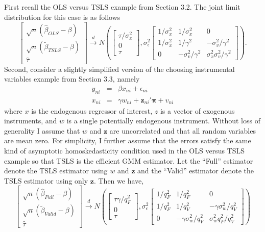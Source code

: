 \documentclass[12pt,letterpaper]{article}
\begin{document}
First recall the OLS versus TSLS example from Section 3.2.
The joint limit distribution for this case is as follows
\begin{equation*}
  \left[ 
  \begin{array}{c}
    \sqrt{n} \left( \widehat{\beta}_{OLS} - \beta \right)\\
    \sqrt{n} \left( \widetilde{\beta}_{TSLS} - \beta \right)\\
    \widehat{\tau}
\end{array}
\right] \overset{d}{\rightarrow} N\left( \left[
\begin{array}{c}
  \tau/\sigma_x^2 \\ 0 \\ \tau
\end{array}
\right], \sigma_{\epsilon}^2 
\left[
\begin{array}{ccc}
  1/\sigma_x^2 & 1/\sigma_x^2 & 0\\
  1/\sigma_x^2 & 1/\gamma^2 & -\sigma_v^2/\gamma^2\\
  0 & -\sigma_v^2/\gamma^2 & \sigma_x^2 \sigma_v^2/\gamma^2
\end{array}
\right]\right).
\end{equation*}
Second, consider a slightly simplified version of the choosing instrumental variables example from Section 3.3, namely
\begin{eqnarray*}
  y_{ni} &=& \beta x_{ni} + \epsilon_{ni}\\
  x_{ni} &=& \gamma w_{ni} + \mathbf{z}_{ni}' \boldsymbol{\pi} + v_{ni}
\end{eqnarray*}
where $x$ is the endogenous regressor of interest, $z$ is a vector of exogenous instruments, and $w$ is a single potentially endogenous instrument.
Without loss of generality I assume that $w$ and $\mathbf{z}$ are uncorrelated and that all random variables are mean zero.
For simplicity, I further assume that the errors satisfy the same kind of asymptotic homoskedasticity condition used in the OLS versus TSLS example so that TSLS is the efficient GMM estimator.
Let the ``Full'' estimator denote the TSLS estimator using $w$ and $\mathbf{z}$ and the ``Valid'' estimator denote the TSLS estimator using only $\mathbf{z}$.
Then we have,
\begin{equation*}
  \left[ 
  \begin{array}{c}
    \sqrt{n} \left( \widehat{\beta}_{Full} - \beta \right)\\
    \sqrt{n} \left( \widetilde{\beta}_{Valid} - \beta \right)\\
    \widehat{\tau}
\end{array}
\right] \overset{d}{\rightarrow} N\left( \left[
\begin{array}{c}
  \tau\gamma/q^2_{F} \\ 0 \\ \tau
\end{array}
\right], \sigma_{\epsilon}^2 
\left[
\begin{array}{ccc}
  1/q_{F}^2 & 1/q_{F}^2 & 0\\
  1/q_{F}^2 & 1/q_{V}^2 & -\gamma\sigma_w^2/q^2_{V}\\ 
  0 & -\gamma\sigma_w^2/q^2_{V} & \sigma_w^2 q^2_{F}/q^2_{V}
\end{array}
\right]\right)
\end{equation*}
\end{document}
